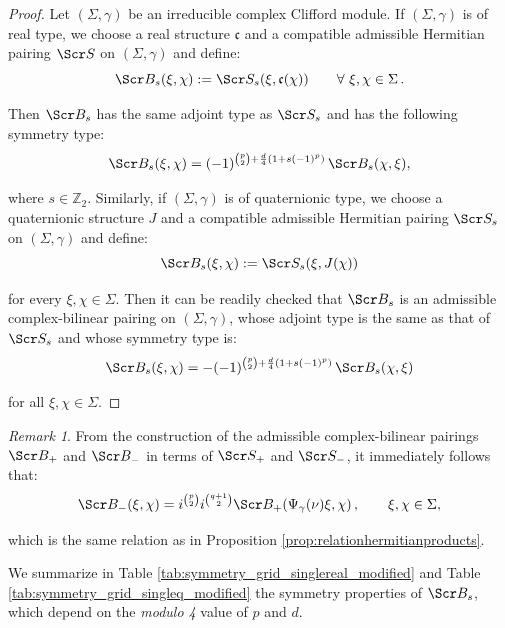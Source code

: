 \documentclass[10pt,a4paper,twoside,reqno]{amsart}
\theoremstyle{plain}
\theoremstyle{definition}
\theoremstyle{remark}
\newtheorem{remark}[thm]{Remark}
\def\scB{\Scr B}
\def\scS{\Scr S}
\def\frc{\mathfrak{F}}
\def\frc{\mathfrak{c}}
\begin{document}
\begin{proof}
 Let $(\Sigma,\gamma)$ be an irreducible complex Clifford module. If $(\Sigma,\gamma)$ is of real type, we choose a real structure $\frc$ and a compatible admissible Hermitian pairing $\scS$ on $(\Sigma,\gamma)$ and define:
 \begin{equation*}
\scB_{s}(\xi,\chi) := \scS_{s}(\xi,\frc(\chi)) \qquad \forall\,\, \xi, \chi \in \Sigma\, .
 \end{equation*}

\noindent
Then $\scB_{s}$ has the same adjoint type as $\scS_{s}$ and has the following symmetry type:
\begin{equation*}
\scB_{s}(\xi,\chi) = (-1)^{\binom{p}{2}+\frac{d}{4}(1+s(-1)^p)}\, \scB_{s}(\chi,\xi),
\end{equation*}

\noindent
where $s\in\mathbb{Z}_2$. Similarly, if $(\Sigma,\gamma)$ is of quaternionic type, we choose a quaternionic structure $J$ and a compatible admissible Hermitian pairing $\scS_{s}$ on $(\Sigma,\gamma)$ and define:
\begin{equation*}
\scB_{s}(\xi,\chi) := \scS_{s}(\xi,J(\chi)) 
\end{equation*}

\noindent
for every $\xi, \chi \in \Sigma$. Then it can be readily checked that $\scB_{s}$ is an admissible complex-bilinear pairing on $(\Sigma,\gamma)$, whose adjoint type is the same as that of $\scS_{s}$ and whose symmetry type is:
\begin{equation*}
\scB_{s}(\xi,\chi)  =  - (-1)^{\binom{p}{2}+\frac{d}{4}(1+s(-1)^p)}\, \scB_{s}(\chi,\xi)  
\end{equation*}

\noindent
for all $\xi, \chi \in \Sigma$.
\end{proof}

\begin{remark}
From the construction of the admissible complex-bilinear pairings $\scB_{+}$ and $\scB_{-}$ in terms of $\scS_{+}$ and $\scS_{-}$, it immediately follows that:
\begin{equation*}
\scB_-(\xi,\chi) = i^{\binom{p}{2}}i^{\binom{q+1}{2}}\scB_+(\Psi_\gamma(\nu)\xi,\chi)\, , \qquad \xi , \chi \in \Sigma,
\end{equation*}

\noindent
which is the same relation as in Proposition \ref{prop:relationhermitianproducts}.
\end{remark}

\noindent
We summarize in Table \ref{tab:symmetry_grid_singlereal_modified} and Table \ref{tab:symmetry_grid_singleq_modified} the symmetry properties of $\scB_s$, which depend on the \emph{modulo 4} value of $p$ and $d$.\medskip
\end{document}
